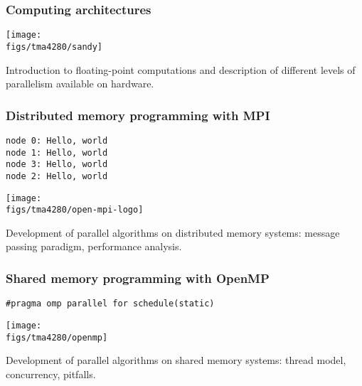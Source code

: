 \begin{frame}
  \frametitle{Computing architectures}
  \begin{center}
    \texttt{[image: \\figs/tma4280/sandy]}
  \end{center}

Introduction to floating-point computations and description of different levels of parallelism available on hardware.
\end{frame}

\begin{frame}[fragile]
  \frametitle{Distributed memory programming with MPI}
  \begin{center}
    \texttt{node 0: Hello, world} \\
    \texttt{node 1: Hello, world} \\
    \texttt{node 3: Hello, world} \\
    \texttt{node 2: Hello, world}
  \end{center}
  \begin{center}
    \texttt{[image: \\figs/tma4280/open-mpi-logo]}
  \end{center}

\vspace{4em}
Development of parallel algorithms on distributed memory systems: message passing paradigm, performance analysis.
\end{frame}

\begin{frame}
  \frametitle{Shared memory programming with OpenMP}

\vspace{4em}
  \begin{center}
    \texttt{\#pragma omp parallel for schedule(static)}
  \end{center}
  \begin{center}
    \texttt{[image: \\figs/tma4280/openmp]}
  \end{center}

\vspace{4em}
Development of parallel algorithms on shared memory systems: thread model, concurrency, pitfalls. 
\end{frame}


